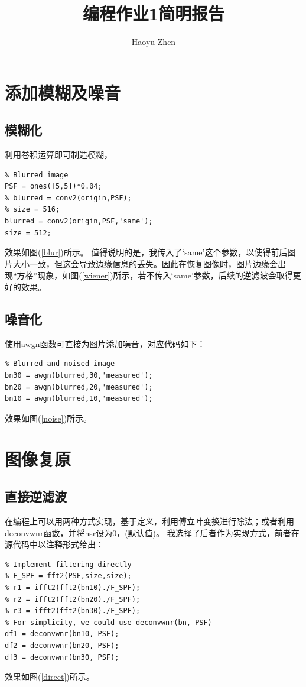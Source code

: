 \documentclass{article}
\begin{document}
\title{编程作业1简明报告}
\author{Haoyu Zhen}
\maketitle
\begin{multicols}{2}
\section{添加模糊及噪音}
\subsection{模糊化}
利用卷积运算即可制造模糊，
\begin{lstlisting}
% Blurred image
PSF = ones([5,5])*0.04;
% blurred = conv2(origin,PSF);
% size = 516;
blurred = conv2(origin,PSF,'same');
size = 512;
\end{lstlisting}
效果如图(\ref{blur})所示。
值得说明的是，我传入了`same'这个参数，以使得前后图片大小一致，但这会导致边缘信息的丢失。因此在恢复图像时，图片边缘会出现“方格”现象，如图(\ref{wiener})所示，若不传入`same'参数，后续的逆滤波会取得更好的效果。
\subsection{噪音化}
使用awgn函数可直接为图片添加噪音，对应代码如下：
\begin{lstlisting}
% Blurred and noised image
bn30 = awgn(blurred,30,'measured');
bn20 = awgn(blurred,20,'measured');
bn10 = awgn(blurred,10,'measured');
\end{lstlisting}
效果如图(\ref{noise})所示。

\section{图像复原}
\subsection{直接逆滤波}
在编程上可以用两种方式实现，基于定义，利用傅立叶变换进行除法；或者利用deconvwnr函数，并将nsr设为0，(默认值)。
我选择了后者作为实现方式，前者在源代码中以注释形式给出：
\begin{lstlisting}
% Implement filtering directly
% F_SPF = fft2(PSF,size,size);
% r1 = ifft2(fft2(bn10)./F_SPF);
% r2 = ifft2(fft2(bn20)./F_SPF);
% r3 = ifft2(fft2(bn30)./F_SPF);
% For simplicity, we could use deconvwnr(bn, PSF)
df1 = deconvwnr(bn10, PSF);
df2 = deconvwnr(bn20, PSF);
df3 = deconvwnr(bn30, PSF);
\end{lstlisting}
效果如图(\ref{direct})所示。




\end{multicols}
\end{document}
